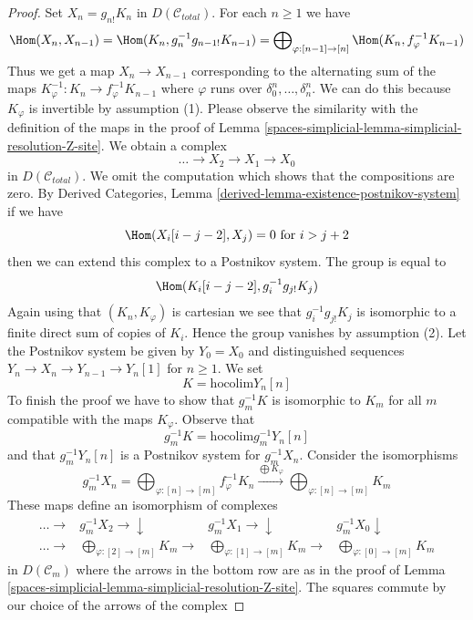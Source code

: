 \begin{proof}
Set $X_n = g_{n!}K_n$ in $D(\mathcal{C}_{total})$. For each $n \geq 1$
we have
$$
\Hom(X_n, X_{n - 1}) =
\Hom(K_n, g_n^{-1}g_{n - 1!}K_{n - 1}) =
\bigoplus\nolimits_{\varphi : [n - 1] \to [n]}
\Hom(K_n, f_\varphi^{-1}K_{n - 1})
$$
Thus we get a map $X_n \to X_{n - 1}$ corresponding to the
alternating sum of the maps
$K_\varphi^{-1} : K_n \to f_\varphi^{-1}K_{n - 1}$
where $\varphi$ runs over $\delta^n_0, \ldots, \delta^n_n$.
We can do this because $K_\varphi$ is invertible by assumption (1).
Please observe the similarity with the definition of the maps
in the proof of Lemma \ref{spaces-simplicial-lemma-simplicial-resolution-Z-site}.
We obtain a complex
$$
\ldots \to X_2 \to X_1 \to X_0
$$
in $D(\mathcal{C}_{total})$. We omit the computation which shows
that the compositions are zero. By
Derived Categories, Lemma \ref{derived-lemma-existence-postnikov-system}
if we have
$$
\Hom(X_i[i - j - 2], X_j) = 0\text{ for }i > j + 2
$$
then we can extend this complex to a Postnikov system.
The group is equal to
$$
\Hom(K_i[i - j - 2], g_i^{-1}g_{j!}K_j)
$$
Again using that $(K_n, K_\varphi)$ is cartesian we see that
$g_i^{-1}g_{j!}K_j$ is isomorphic to a finite direct sum of copies of
$K_i$. Hence the group vanishes by assumption (2).
Let the Postnikov system be given by $Y_0 = X_0$ and distinguished
sequences $Y_n \to X_n \to Y_{n - 1} \to Y_n[1]$ for $n \geq 1$.
We set
$$
K = \text{hocolim} Y_n[n]
$$
To finish the proof we have to show that $g_m^{-1}K$ is isomorphic
to $K_m$ for all $m$ compatible with the maps $K_\varphi$. Observe that
$$
g_m^{-1} K = \text{hocolim} g_m^{-1}Y_n[n]
$$
and that $g_m^{-1}Y_n[n]$ is a Postnikov system for $g_m^{-1}X_n$.
Consider the isomorphisms
$$
g_m^{-1}X_n =
\bigoplus\nolimits_{\varphi : [n] \to [m]} f_\varphi^{-1}K_n
\xrightarrow{\bigoplus K_\varphi}
\bigoplus\nolimits_{\varphi : [n] \to [m]} K_m
$$
These maps define an isomorphism of complexes
$$
\begin{array}{cccc}\ldots \longrightarrow & g_m^{-1}X_2 \longrightarrow\downarrow & g_m^{-1}X_1 \longrightarrow\downarrow & g_m^{-1}X_0 \downarrow \\ \ldots \longrightarrow & \bigoplus\nolimits_{\varphi : [2] \to [m]} K_m \longrightarrow & \bigoplus\nolimits_{\varphi : [1] \to [m]} K_m \longrightarrow & \bigoplus\nolimits_{\varphi : [0] \to [m]} K_m\end{array}
$$
in $D(\mathcal{C}_m)$ where the arrows in the bottom row are as
in the proof of Lemma \ref{spaces-simplicial-lemma-simplicial-resolution-Z-site}.
The squares commute by our choice of the arrows of the complex

\end{proof}
